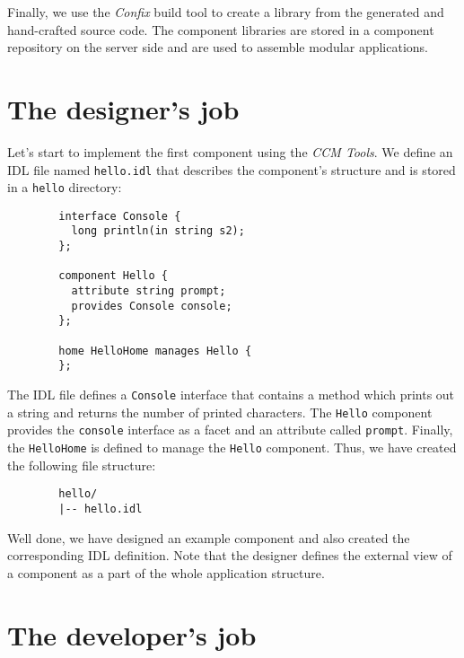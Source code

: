 Finally, we use the {\it Confix} build tool to create a library from the generated and
hand-crafted source code. The component libraries are stored in a component repository on the
server side and are used to assemble modular applications.

  

\section{The designer's job}

Let's start to implement the first component using the {\it CCM Tools}.
We define an IDL file named {\tt hello.idl} that describes the component's structure
and is stored in a {\tt hello} directory:
\begin{verbatim}
        interface Console {
          long println(in string s2);
        };

        component Hello {
          attribute string prompt;	
          provides Console console;
        };

        home HelloHome manages Hello {
        };
\end{verbatim}

The IDL file  defines a {\tt Console} interface that contains a method which prints 
out a string and returns the number of printed characters. 
The {\tt Hello} component provides the {\tt console} interface as a facet 
and an attribute called {\tt prompt}.
Finally, the {\tt HelloHome} is defined to manage the {\tt Hello} component.
Thus, we have created the following file structure:  
\begin{verbatim}
        hello/
        |-- hello.idl
\end{verbatim}

Well done, we have designed an example component and also created the corresponding
IDL definition. 
Note that the designer defines the external view of a component as a part of the
whole application structure.



\section{The developer's job}


